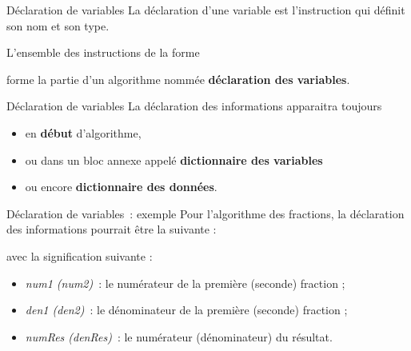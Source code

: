 \begin{frame}{Déclaration de variables}
	La déclaration d’une variable est l’instruction 
	qui définit son nom et son type.
	
	\bigskip
	
	L’ensemble des instructions de la forme


	forme la partie d’un algorithme nommée 
	\textbf{déclaration des variables}. 
\end{frame}

\begin{frame}{Déclaration de variables}
	La déclaration des informations apparaitra toujours 
	\begin{itemize}
	\item 
	en \textbf{début} d’algorithme, 
	\item
	ou dans un bloc annexe appelé 
	\textbf{dictionnaire des variables} 
	\item
	ou encore \textbf{dictionnaire des données}.
	\end{itemize}
\end{frame}

\begin{frame}{Déclaration de variables~: exemple}
	Pour l’algorithme des fractions, la déclaration des
	informations pourrait être la suivante :


	avec la signification suivante :

	\begin{itemize}
	\item
		\textit{num1 (num2)}~: le numérateur 
		de la première (seconde) fraction ;
	\item
		\textit{den1 (den2)}~: le dénominateur 
		de la première (seconde) fraction ;
	\item
		\textit{numRes (denRes)}~:
		le numérateur (dénominateur) du résultat.
	\end{itemize}
\end{frame}

